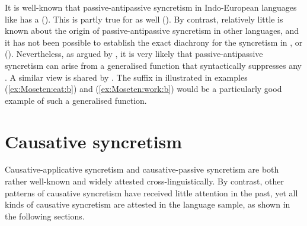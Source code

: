 It is well-known that passive-antipassive syncretism in Indo-European languages like  has a  (). This is partly true for  as well (). By contrast, relatively little is known about the origin of passive-antipassive syncretism in other languages, and it has not been possible to establish the exact diachrony for the syncretism in ,  or  (). Nevertheless, as argued by \citet[180]{janic:2016}, it is very likely that passive-antipassive syncretism can arise from a generalised function that syntactically suppresses any . A similar view is shared by \citet[24]{malchukov:2017}. The suffix  in  illustrated in examples (\ref{ex:Moseten:eat:b}) and (\ref{ex:Moseten:work:b}) would be a particularly good example of such a generalised function.

\section{Causative syncretism} \label{sec:simple-syncretism:causative}
Causative-applicative syncretism and causative-passive syncretism are both rather well-known and widely attested cross-linguistically. By contrast, other patterns of causative syncretism have received little attention in the past, yet all kinds of causative syncretism are attested in the language sample, as shown in the following sections.

